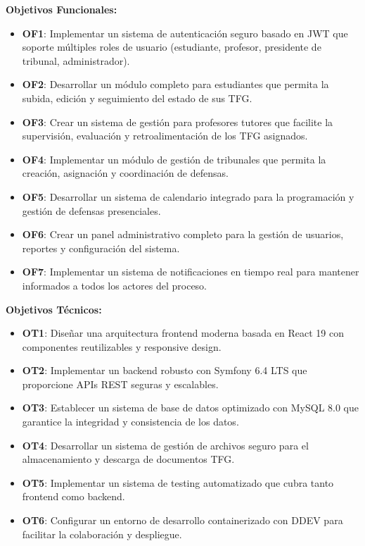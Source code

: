 \documentclass[12pt,a4paper,oneside]{report}
\providecommand{\tightlist}{%
  \setlength{\itemsep}{0pt}\setlength{\parskip}{0pt}}
\begin{document}
\textbf{Objetivos Funcionales:}

\begin{itemize}
\tightlist
\item
  \textbf{OF1}: Implementar un sistema de autenticación seguro basado en
  JWT que soporte múltiples roles de usuario (estudiante, profesor,
  presidente de tribunal, administrador).
\item
  \textbf{OF2}: Desarrollar un módulo completo para estudiantes que
  permita la subida, edición y seguimiento del estado de sus TFG.
\item
  \textbf{OF3}: Crear un sistema de gestión para profesores tutores que
  facilite la supervisión, evaluación y retroalimentación de los TFG
  asignados.
\item
  \textbf{OF4}: Implementar un módulo de gestión de tribunales que
  permita la creación, asignación y coordinación de defensas.
\item
  \textbf{OF5}: Desarrollar un sistema de calendario integrado para la
  programación y gestión de defensas presenciales.
\item
  \textbf{OF6}: Crear un panel administrativo completo para la gestión
  de usuarios, reportes y configuración del sistema.
\item
  \textbf{OF7}: Implementar un sistema de notificaciones en tiempo real
  para mantener informados a todos los actores del proceso.
\end{itemize}

\textbf{Objetivos Técnicos:}

\begin{itemize}
\tightlist
\item
  \textbf{OT1}: Diseñar una arquitectura frontend moderna basada en
  React 19 con componentes reutilizables y responsive design.
\item
  \textbf{OT2}: Implementar un backend robusto con Symfony 6.4 LTS que
  proporcione APIs REST seguras y escalables.
\item
  \textbf{OT3}: Establecer un sistema de base de datos optimizado con
  MySQL 8.0 que garantice la integridad y consistencia de los datos.
\item
  \textbf{OT4}: Desarrollar un sistema de gestión de archivos seguro
  para el almacenamiento y descarga de documentos TFG.
\item
  \textbf{OT5}: Implementar un sistema de testing automatizado que cubra
  tanto frontend como backend.
\item
  \textbf{OT6}: Configurar un entorno de desarrollo containerizado con
  DDEV para facilitar la colaboración y despliegue.
\end{itemize}
\end{document}
